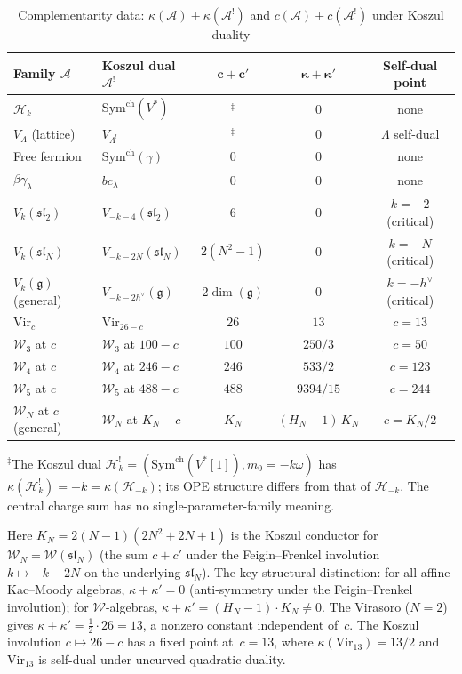 \documentclass[11pt]{article}
\theoremstyle{plain}
\theoremstyle{definition}
\theoremstyle{remark}
\providecommand{\fg}{\mathfrak{g}}
\providecommand{\cA}{\mathcal{A}}
\providecommand{\cH}{\mathcal{H}}
\providecommand{\cW}{\mathcal{W}}
\begin{document}
\begin{table}[ht]
\centering
\caption{Complementarity data: $\kappa(\cA) + \kappa(\cA^!)$ and
$c(\cA) + c(\cA^!)$ under Koszul duality}
\label{tab:complementarity}
\renewcommand{\arraystretch}{1.35}
{\small
\begin{tabular}{llccc}
\toprule
\textbf{Family $\cA$}
 & \textbf{Koszul dual $\cA^!$}
 & $\boldsymbol{c + c'}$
 & $\boldsymbol{\kappa + \kappa'}$
 & \textbf{Self-dual point} \\
\midrule
$\cH_k$
 & $\mathrm{Sym}^{\mathrm{ch}}(V^*)$
 & ${}^{\ddagger}$ & $0$ & none \\
$V_\Lambda$ (lattice)
 & $V_{\Lambda^!}$
 & ${}^{\ddagger}$ & $0$ & $\Lambda$ self-dual \\
Free fermion
 & $\mathrm{Sym}^{\mathrm{ch}}(\gamma)$
 & $0$ & $0$ & none \\
$\beta\gamma_\lambda$
 & $bc_\lambda$
 & $0$ & $0$ & none \\[3pt]
\midrule
$V_k(\mathfrak{sl}_2)$
 & $V_{-k-4}(\mathfrak{sl}_2)$
 & $6$ & $0$ & $k = -2$ (critical) \\
$V_k(\mathfrak{sl}_N)$
 & $V_{-k-2N}(\mathfrak{sl}_N)$
 & $2(N^2{-}1)$ & $0$ & $k = -N$ (critical) \\
$V_k(\fg)$ (general)
 & $V_{-k-2h^\vee}(\fg)$
 & $2\dim(\fg)$ & $0$ & $k = -h^\vee$ (critical) \\[3pt]
\midrule
$\mathrm{Vir}_c$
 & $\mathrm{Vir}_{26-c}$
 & $26$ & $13$ & $c = 13$ \\
$\cW_3$ at $c$
 & $\cW_3$ at $100{-}c$
 & $100$ & $250/3$ & $c = 50$ \\
$\cW_4$ at $c$
 & $\cW_4$ at $246{-}c$
 & $246$ & $533/2$ & $c = 123$ \\
$\cW_5$ at $c$
 & $\cW_5$ at $488{-}c$
 & $488$ & $9394/15$ & $c = 244$ \\
$\cW_N$ at $c$ (general)
 & $\cW_N$ at $K_N{-}c$
 & $K_N$ & $(H_N{-}1)\,K_N$ & $c = K_N/2$ \\
\bottomrule
\end{tabular}
}
\end{table}

\noindent
${}^{\ddagger}$The Koszul dual
$\cH_k^!=(\mathrm{Sym}^{\mathrm{ch}}(V^*[1]),m_0=-k\omega)$
has $\kappa(\cH_k^!) = -k = \kappa(\cH_{-k})$; its OPE structure
differs from that of $\cH_{-k}$.
The central charge sum has no single-parameter-family meaning.

\noindent
Here $K_N = 2(N{-}1)(2N^2{+}2N{+}1)$ is the Koszul conductor for
$\cW_N = \cW(\mathfrak{sl}_N)$ (the sum $c + c'$ under the
Feigin--Frenkel involution $k \mapsto -k - 2N$ on the underlying
$\mathfrak{sl}_N$). The key structural distinction: for all
affine Kac--Moody algebras, $\kappa + \kappa' = 0$ (anti-symmetry
under the Feigin--Frenkel involution); for $\cW$-algebras,
$\kappa + \kappa' = (H_N - 1) \cdot K_N \neq 0$.
The Virasoro ($N = 2$) gives $\kappa + \kappa' = \tfrac{1}{2} \cdot 26
= 13$, a nonzero constant independent of~$c$. The Koszul involution
$c \mapsto 26 - c$ has a fixed point at~$c = 13$, where
$\kappa(\mathrm{Vir}_{13}) = 13/2$ and $\mathrm{Vir}_{13}$ is self-dual
under uncurved quadratic duality.
\end{document}
